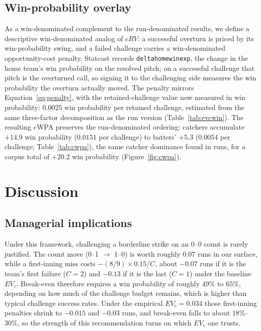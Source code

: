 \subsection{Win-probability overlay}
As a win-denominated complement to the run-denominated results, we define a
descriptive win-denominated analog of $cRV$: a successful overturn is priced by its
win-probability swing, and a failed challenge carries a win-denominated
opportunity-cost penalty. Statcast records
\texttt{delta\crvus{}home\crvus{}win\crvus{}exp}, the change in the home team's
win probability on the resolved pitch; on a successful challenge that pitch is
the overturned call, so signing it to the challenging side measures the win
probability the overturn actually moved. The penalty mirrors
Equation~\ref{eq:penalty}, with the retained-challenge value now measured in
win probability: $0.0025$ win probability per retained challenge, estimated
from the same three-factor decomposition as the run version
(Table~\ref{tab:evcwin}). The resulting cWPA preserves the run-denominated
ordering: catchers accumulate $+14.9$ win probability ($0.0151$ per challenge)
to batters' $+5.3$ ($0.0054$ per challenge; Table~\ref{tab:cwpa}), the same
catcher dominance found in runs, for a corpus total of $+20.2$ win probability
(Figure~\ref{fig:cwpa}).






\section{Discussion}
\subsection{Managerial implications}
Under this framework, challenging a borderline strike on an 0--0 count is
rarely justified. The count move (0--1 $\to$ 1--0) is worth roughly $0.07$
runs in our surface, while a first-inning miss costs $-(8/9) \times 0.15 / C$,
about $-0.07$ runs if it is the team's first failure ($C = 2$) and $-0.13$ if
it is the last ($C = 1$) under the baseline $EV_c$. Break-even therefore
requires a win probability of roughly $49\%$ to $65\%$, depending on how much
of the challenge budget remains, which is higher than typical challenge success rates.
Under the empirical $EV_c = 0.034$ those first-inning penalties shrink to
$-0.015$ and $-0.03$ runs, and break-even falls to about $18\%$--$30\%$, so
the strength of this recommendation turns on which $EV_c$ one trusts.

